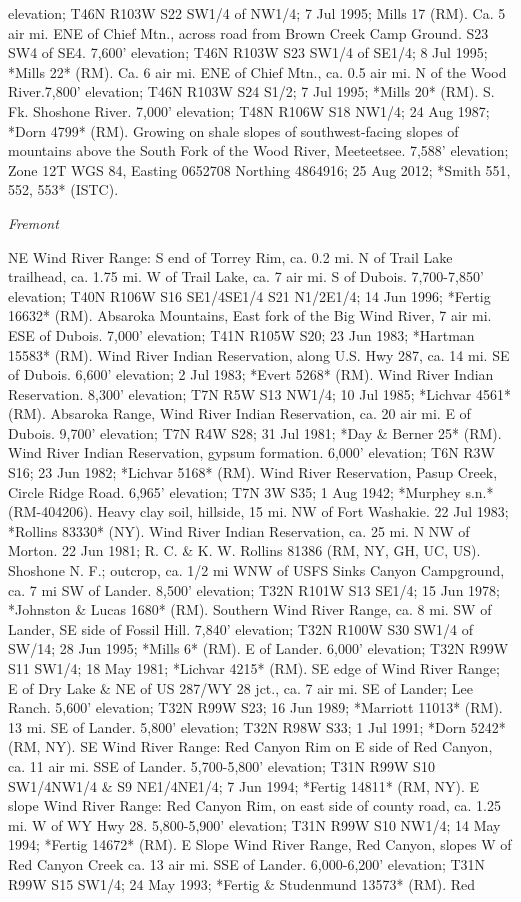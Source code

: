 elevation; T46N R103W S22 SW1/4 of NW1/4; 7 Jul 1995; Mills 17 (RM).  Ca. 5 air mi. ENE of Chief Mtn., across road from Brown Creek Camp Ground. S23 SW4 of SE4. 7,600’ elevation; T46N R103W S23 SW1/4 of SE1/4; 8 Jul 1995; *Mills 22* (RM).  Ca. 6 air mi. ENE of Chief Mtn., ca. 0.5 air mi. N of the Wood River.7,800’ elevation; T46N R103W S24 S1/2; 7 Jul 1995; *Mills 20* (RM).  S. Fk. Shoshone River.  7,000’ elevation; T48N R106W S18 NW1/4; 24 Aug 1987; *Dorn 4799* (RM).  Growing on shale slopes of southwest-facing slopes of mountains above the South Fork of the Wood River, Meeteetsee.  7,588’ elevation; Zone 12T WGS 84, Easting 0652708 Northing 4864916; 25 Aug 2012; *Smith 551, 552, 553* (ISTC).

\textit{Fremont}

NE Wind River Range: S end of Torrey Rim, ca. 0.2 mi. N of Trail Lake trailhead, ca. 1.75 mi. W of Trail Lake, ca. 7 air mi. S of Dubois. 7,700-7,850' elevation; T40N R106W S16 SE1/4SE1/4 S21 N1/2E1/4; 14 Jun 1996; *Fertig 16632* (RM).  Absaroka Mountains, East fork of the Big Wind River, 7 air mi. ESE of Dubois. 7,000' elevation; T41N R105W S20; 23 Jun 1983; *Hartman 15583* (RM).  Wind River Indian Reservation, along U.S. Hwy 287, ca. 14 mi. SE of Dubois. 6,600' elevation; 2 Jul 1983; *Evert 5268* (RM).  Wind River Indian Reservation. 8,300' elevation; T7N R5W S13 NW1/4; 10 Jul 1985; *Lichvar 4561* (RM).  Absaroka Range, Wind River Indian Reservation, ca. 20 air mi. E of Dubois. 9,700' elevation; T7N R4W S28; 31 Jul 1981; *Day \& Berner 25* (RM).  Wind River Indian Reservation, gypsum formation. 6,000' elevation; T6N R3W S16; 23 Jun 1982; *Lichvar 5168* (RM).  Wind River Reservation, Pasup Creek, Circle Ridge Road. 6,965' elevation; T7N 3W S35; 1 Aug 1942; *Murphey s.n.* (RM-404206).  Heavy clay soil, hillside, 15 mi. NW of Fort Washakie. 22 Jul 1983; *Rollins 83330* (NY).  Wind River Indian Reservation, ca. 25 mi. N NW of Morton.  22 Jun 1981; R. C. \& K. W. Rollins 81386 (RM, NY, GH, UC, US).  Shoshone N. F.; outcrop, ca. 1/2 mi WNW of USFS Sinks Canyon Campground, ca. 7 mi SW of Lander. 8,500' elevation; T32N R101W S13 SE1/4; 15 Jun 1978; *Johnston \& Lucas 1680* (RM).  Southern Wind River Range, ca. 8 mi. SW of Lander, SE side of Fossil Hill. 7,840' elevation; T32N R100W S30 SW1/4 of SW/14; 28 Jun 1995; *Mills 6* (RM).  E of Lander. 6,000' elevation; T32N R99W S11 SW1/4; 18 May 1981; *Lichvar 4215* (RM).  SE edge of Wind River Range; E of Dry Lake \& NE of US 287/WY 28 jct., ca. 7 air mi. SE of Lander; Lee Ranch. 5,600' elevation; T32N R99W S23; 16 Jun 1989; *Marriott 11013* (RM).  13 mi. SE of Lander. 5,800' elevation; T32N R98W S33; 1 Jul 1991; *Dorn 5242* (RM, NY).  SE Wind River Range: Red Canyon Rim on E side of Red Canyon, ca. 11 air mi. SSE of Lander.  5,700-5,800' elevation; T31N R99W S10 SW1/4NW1/4 \& S9 NE1/4NE1/4; 7 Jun 1994; *Fertig 14811* (RM, NY).  E slope Wind River Range: Red Canyon Rim, on east side of county road, ca. 1.25 mi. W of WY Hwy 28. 5,800-5,900' elevation; T31N R99W S10 NW1/4; 14 May 1994; *Fertig 14672* (RM).  E Slope Wind River Range, Red Canyon,  slopes W of Red Canyon Creek ca. 13 air mi. SSE of Lander. 6,000-6,200' elevation; T31N R99W S15 SW1/4; 24 May 1993; *Fertig \& Studenmund 13573* (RM).  Red 